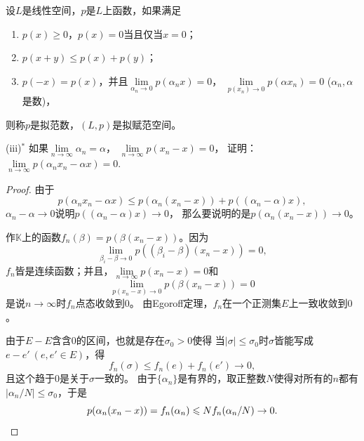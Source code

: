 \begin{8}
    设$L$是线性空间，$p$是$L$上函数，如果满足
    \begin{enumerate}[label=(\arabic*)]
        \item $p(x)\geqslant0$，$p(x)=0$当且仅当$x=0$；
        \item $p(x+y)\leqslant p(x)+p(y)$；
        \item $p(-x)=p(x)$，并且$\lim\limits_{\alpha_n\to0}p(\alpha_nx)=0$，
        $\lim\limits_{p(x_n)\to0}p(\alpha x_n)=0$ ($\alpha_n,\alpha$是数)，
    \end{enumerate}
    则称$p$是拟范数，$(L,p)$是拟赋范空间。

    (iii)$^{*}$ 如果$\lim\limits_{n\to\infty}\alpha_n=\alpha$，
        $\lim\limits_{n\to\infty}p(x_n-x)=0$，
        证明：$\lim\limits_{n\to\infty}p(\alpha_nx_n-\alpha x)=0$.
\end{8}
\begin{proof}
    由于\[p(\alpha_nx_n-\alpha x)
    \leqslant p(\alpha_n(x_n-x))+p((\alpha_n-\alpha)x),\]
    $\alpha_n-\alpha\to0$说明$p((\alpha_n-\alpha)x)\to0$，
    那么要说明的是$p(\alpha_n(x_n-x))\to0$。

    作$\mathbb{K}$上的函数$f_n(\beta)=p(\beta(x_n-x))$。因为
    \[\lim_{\beta_i-\beta\to0}p((\beta_i-\beta)(x_n-x))=0,\]
    $f_n$皆是连续函数；并且，$\lim\limits_{n\to\infty}p(x_n-x)=0$和
    \[\lim_{p(x_n-x)\to0}p(\beta(x_n-x))=0\]
    是说$n\to\infty$时$f_n$点态收敛到$0$。
    由Egoroff定理，$f_n$在一个正测集$E$上一致收敛到$0$。

    由于$E-E$含含$0$的区间，也就是存在$\sigma_0>0$使得
    当$|\sigma|\leqslant\sigma_0$时$\sigma$皆能写成$e-e'\ (e,e'\in E)$，得
    \[f_n(\sigma)\leqslant f_n(e)+f_n(e')\to0,\]
    且这个趋于$0$是关于$\sigma$一致的。
    由于$\{\alpha_n\}$是有界的，取正整数$N$使得对所有的$n$都有
    $|\alpha_n/N|\leqslant\sigma_0$，于是
    \[p(\alpha_n(x_n-x))=f_n(\alpha_n)
    \leqslant Nf_n(\alpha_n/N)\to0.\qedhere\]
\end{proof}

